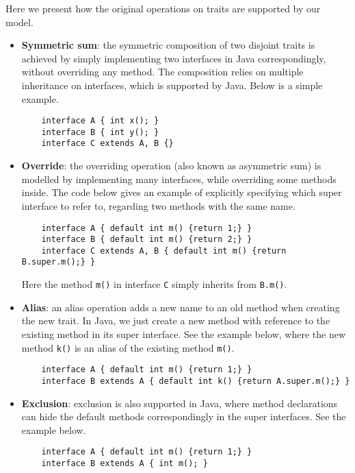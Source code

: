 Here we present how the original operations on traits are supported by our model.
\begin{itemize}
\item \textbf{Symmetric sum}: the symmetric composition of two disjoint traits is achieved by simply implementing two interfaces in Java correspondingly, without overriding any method. The composition relies on multiple inheritance on interfaces, which is supported by Java. Below is a simple example.
    \begin{lstlisting}
    interface A { int x(); }
    interface B { int y(); }
    interface C extends A, B {}
    \end{lstlisting}
\item \textbf{Override}: the overriding operation (also known as asymmetric sum) is modelled by implementing many interfaces, while overriding some methods inside. The code below gives an example of explicitly specifying which super interface to refer to, regarding two methods with the same name.
    \begin{lstlisting}
    interface A { default int m() {return 1;} }
    interface B { default int m() {return 2;} }
    interface C extends A, B { default int m() {return B.super.m();} }
    \end{lstlisting}
    Here the method \texttt{m()} in interface \texttt{C} simply inherits from \texttt{B.m()}.
\item \textbf{Alias}: an alias operation adds a new name to an old method when creating the new trait. In Java, we just create a new method with reference to the existing method in its super interface. See the example below, where the new method \texttt{k()} is an alias of the existing method \texttt{m()}.
    \begin{lstlisting}
    interface A { default int m() {return 1;} }
    interface B extends A { default int k() {return A.super.m();} }
    \end{lstlisting}
\item \textbf{Exclusion}: exclusion is also supported in Java, where method declarations can hide the default methods correspondingly in the super interfaces. See the example below.
    \begin{lstlisting}
    interface A { default int m() {return 1;} }
    interface B extends A { int m(); }
    \end{lstlisting}
\end{itemize}

